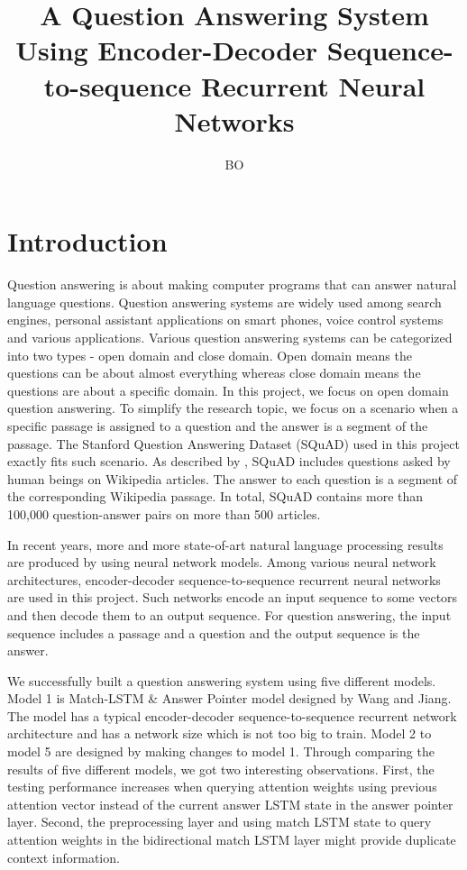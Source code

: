 \documentclass[modernstyle,12pt]{sjsuthesis}
\title{A Question Answering System Using Encoder-Decoder Sequence-to-sequence Recurrent Neural Networks}
\author{BO}{LI}
\theoremstyle{definition}
\begin{document}
\raggedright          %
\parindent=30pt       %




\chapter{Introduction}

Question answering is about making computer programs that can answer natural language questions. Question answering systems are widely used among search engines, personal assistant applications on smart phones, voice control systems and various applications. Various question answering systems can be categorized into two types - open domain and close domain. Open domain means the questions can be about almost everything whereas close domain means the questions are about a specific domain. In this project, we focus on open domain question answering. To simplify the research topic, we focus on a scenario when a specific passage is assigned to a question and the answer is a segment of the passage. The Stanford Question Answering Dataset (SQuAD) used in this project exactly fits such scenario. As described by \cite{rajpurkar2016squad}, SQuAD includes questions asked by human beings on Wikipedia articles. The answer to each question is a segment of the corresponding Wikipedia passage. In total, SQuAD contains more than 100,000 question-answer pairs on more than 500 articles.

In recent years, more and more state-of-art natural language processing results are produced by using neural network models. Among various neural network architectures, encoder-decoder sequence-to-sequence recurrent neural networks are used in this project. Such networks encode an input sequence to some vectors and then decode them to an output sequence. For question answering, the input sequence includes a passage and a question and the output sequence is the answer.


We successfully built a question answering system using five different models. Model 1 is Match-LSTM \& Answer Pointer model designed by Wang and Jiang\cite{wang2016machine}. The model has a typical encoder-decoder sequence-to-sequence recurrent network architecture and has a network size which is not too big to train. Model 2 to model 5 are designed by making changes to model 1. Through comparing the results of five different models, we got two interesting observations. First, the testing performance increases when querying attention weights using previous attention vector instead of the current answer LSTM state in the answer pointer layer. Second, the preprocessing layer and using match LSTM state to query attention weights in the bidirectional match LSTM layer might provide duplicate context information.
\end{document}
